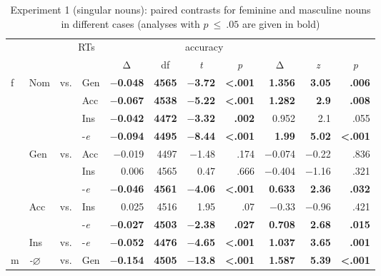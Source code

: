 \documentclass[output=paper, modfonts,newtxmath,hidelinks]{langscibook}
\begin{document}
\begin{table}
\centering
\caption{Experiment 1 (singular nouns): paired contrasts for feminine and masculine nouns in different cases (analyses with $p~\leq~.05$ are given in bold)}
\label{tab:caseSgComparisons}
 \begin{tabular}{*{4}l*{7}r} 
  \lsptoprule
	\multicolumn{4}{l}{}	&	\multicolumn{4}{c}{RTs}	&	\multicolumn{3}{c}{accuracy}\\
	\cline{5-11}
 	\multicolumn{4}{l}{}	&	\multicolumn{1}{c}{Δ} 	& \multicolumn{1}{c}{df}	&	\multicolumn{1}{c}{\textit{t}}	&	\multicolumn{1}{c}{\textit{p}}	&	\multicolumn{1}{c}{Δ} & \multicolumn{1}{c}{\textit{z}}	& \multicolumn{1}{c}{\textit{p}}	\\ 
  \midrule
	f	&	Nom	&	vs.	&	Gen	&	\textbf{$-$0.048}	&	\textbf{4565}	& 	\textbf{$-$3.72}	&	\textbf{<.001}	& 	\textbf{1.356}	& 	\textbf{3.05}	& 	\textbf{.006}	\\
	~	&	~	&	~	&	Acc	&	\textbf{$-$0.067}	&	\textbf{4538}	& 	\textbf{$-$5.22}	&	\textbf{<.001}	& 	\textbf{1.282}	& 	\textbf{2.9}	& 	\textbf{.008}	\\
~	&	~	&	~	&	Ins	&	\textbf{$-$0.042}	&	\textbf{4472}	& 	\textbf{$-$3.32}	&	\textbf{.002}	& 	0.952	& 	2.1	& 	.055	\\
	~	&	~	&	~	&	-\textit{e}	&	\textbf{$-$0.094}	&	\textbf{4495}	& 	\textbf{$-$8.44}	&	\textbf{<.001}	&	\textbf{1.99}	&	\textbf{5.02}	&	\textbf{<.001}	\\
~	&	Gen	&	vs.	&	Acc	&	$-$0.019	&	4497	& 	$-$1.48	&	.174	& 	$-$0.074	& 	$-$0.22	& 	.836	\\
~	&	~	&	~	&	Ins	&	0.006	&	4565	& 	0.47	&	.666	& 	$-$0.404	& 	$-$1.16	& 	.321	\\
~	&	~	&	~	&	-\textit{e}	&	\textbf{$-$0.046}	&	\textbf{4561}	& 	\textbf{$-$4.06}	&	\textbf{<.001}	&	\textbf{0.633}	&	\textbf{2.36}	&	\textbf{.032}	\\
~	& 	Acc	&	vs.	&	Ins	&	0.025	&	4516	& 	1.95	&	.07	& 	$-$0.33	& 	$-$0.96	& 	.421	\\
~	&	~	&	~	&	-\textit{e}	&	\textbf{$-$0.027}	&	\textbf{4503}	& 	\textbf{$-$2.38}	&	\textbf{.027}	& 	\textbf{0.708}	&	\textbf{2.68}	&	\textbf{.015}	\\
~	& 	Ins	&	vs.	&	-\textit{e}	&	\textbf{$-$0.052}	&	\textbf{4476}	& 	\textbf{$-$4.65}	&	\textbf{<.001}	& 	\textbf{1.037}	& 	\textbf{3.65}	& 	\textbf{.001}	\\
    \midrule
    m	&	\textit{-$\varnothing$}	&	vs.	&	Gen	&	\textbf{$-$0.154}	&	\textbf{4505}	& 	\textbf{$-$13.8}	&	\textbf{<.001}	& 	\textbf{1.587}	& 	\textbf{5.39}	& 	\textbf{<.001}	\\

\end{tabular}
\end{table}
\end{document}
